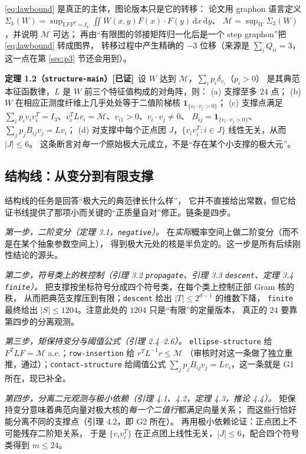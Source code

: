\documentclass[UTF8,11pt]{ctexart}
\newcommand{\E}{\mathbb{E}}
\newcommand{\M}{\mathcal{M}}
\newcommand{\dd}{\,\mathrm{d}}
\newcommand{\file}[1]{\texttt{#1}}
\newcommand{\ok}{\textcolor[rgb]{0.05,0.45,0.15}{\bfseries [已证]}}
\begin{document}
\eqref{eq:lawbound} 是真正的主体，图论版本只是它的转移：
论文用 graphon 语言定义
$\Sigma_k(W)=\sup_{\E FF^T=I_k}\iint W(x,y)F(x)\cdot F(y)\dd x\dd y$、
$\M=\sup_W\Sigma_3(W)$，并说明 $\M$ 可达；
再由``有限图的邻接矩阵归一化后是一个 step graphon''把 \eqref{eq:lawbound} 转成图界，
转移过程中产生精确的 $-3$ 位移（来源是 $\sum_i Q_{ii}=3$，这一点在第 \ref{sec:p3} 节还会用到）。

\textbf{定理 1.2（\file{structure-main}）}\ok\ 设 $W$ 达到 $\M$，$\sum_i p_i\delta_{v_i}$（$p_i>0$）
是其典范本征函数律，$L$ 是 $W$ 前三个特征值构成的对角阵，则：
(a) 支撑至多 $24$ 点；
(b) $W$ 在相应正测度纤维上几乎处处等于二值阶梯核 $\mathbf 1_{\{v_i\cdot v_j>0\}}$；
(c) 支撑点满足 $\sum_i p_iv_iv_i^T=I_3$、$v_i^TLv_i=\M$、$v_{i1}>0$、$v_i\cdot v_j\ne0$、
$B_{ij}=\mathbf 1_{\{v_i\cdot v_j>0\}}$、$\sum_jp_jB_{ij}v_j=Lv_i$；
(d) 对支撑中每个正点团 $J$，$\{v_iv_i^T:i\in J\}$ 线性无关，从而 $|J|\le6$。
这条断言对\emph{每一个}原始极大元成立，不是``存在某个小支撑的极大元''。

\subsection{结构线：从变分到有限支撑}

结构线的任务是回答``极大元的典范律长什么样''，
它并不直接给出常数，但它给证书线提供了那项小而关键的``正质量自对''修正。链条是四步。

\emph{第一步，二阶变分（定理 3.1，\file{negative}）。}
在\emph{实际}概率空间上做二阶变分（而不是在某个抽象参数空间上），
得到极大元处的核是半负定的。这一步是所有后续刚性结论的源头。

\emph{第二步，符号类上的秩控制（引理 3.2 \file{propagate}、引理 3.3 \file{descent}、定理 3.4 \file{finite}）。}
把支撑按坐标符号分成四个符号类，在每个类上控制正部 Gram 核的秩，
从而把典范支撑压到有限；\file{descent} 给出 $|T|\le2^{d-1}$ 的维数下降，
\file{finite} 最终给出 $|S|\le1204$。注意此处的 $1204$ 只是``有限''的定量版本，
真正的 $24$ 要靠第四步的分离观测。

\emph{第三步，矩保持变分与阈值公式（引理 2.4--2.6）。}
\file{ellipse-structure} 给 $F^TLF=\M$ a.e.；\file{row-insertion} 给 $r^TL^{-1}r\le\M$
（审核时对这一条做了独立重推，通过）；\file{contact-structure} 给阈值公式
$\sum_jp_jB_{ij}v_j=Lv_i$，这一条就是 G1 所在，现已补全。

\emph{第四步，分离二元观测与极小依赖（引理 4.1、4.2，定理 4.3，推论 4.4）。}
矩保持变分意味着典范向量对极大核的\emph{每一个二值行}都满足向量关系；
而这些行恰好能分离不同的支撑点（引理 4.2，即 G2 所在）。
再用极小依赖论证：正点团上不可能残存二阶矩关系，
于是 $\{v_iv_i^T\}$ 在正点团上线性无关，$|J|\le6$，配合四个符号类得到 $m\le24$。
\end{document}
